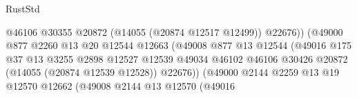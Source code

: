 \begin{lexlean}{RustStd}
\begin{coremodule}
                                                      @46106
                                                      @30355
                                                      @20872
                                                      (@14055 (@20874 @12517 @12499))
                                                      @22676))
                                                  (@49000
                                                    @877
                                                    @2260
                                                    @13
                                                    @20
                                                    @12544
                                                    @12663
                                                    (@49008
                                                      @877
                                                      @13
                                                      @12544
                                                      (@49016
                                                        @175
                                                        @37
                                                        @13
                                                        @3255
                                                        @2898
                                                        @12527
                                                        @12539
                                                        @49034
                                                        @46102
                                                        @46106
                                                        @30426
                                                        @20872
                                                        (@14055 (@20874 @12539 @12528))
                                                        @22676))
                                                    (@49000
                                                      @2144
                                                      @2259
                                                      @13
                                                      @19
                                                      @12570
                                                      @12662
                                                      (@49008
                                                        @2144
                                                        @13
                                                        @12570
                                                        (@49016

\end{coremodule}
\end{lexlean}
